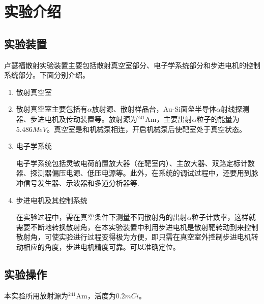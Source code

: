 \documentclass{article}
\begin{document}
\section{实验介绍}
\subsection{实验装置}
卢瑟福散射实验装置主要包括散射真空室部分、电子学系统部分和步进电机的控制系统部分。下面分别介绍。

\begin{enumerate}

\item 散射真空室
\item 
散射真空室主要包括有$\alpha$放射源、散射样品台，Au-Si面垒半导体$\alpha$射线探测器、步进电机及传动装置等。放射源为$^{241}\text{Am}$，主要出射$\alpha$粒子的能量为$5.486\si{MeV}$。真空室是和机械泵相连，开启机械泵后使靶室处于真空状态。

\item
  电子学系统

电子学系统包括灵敏电荷前置放大器（在靶室内）、主放大器、双路定标计数器、探测器偏压电源、低压电源等。此外，在系统的调试过程中，还要用到脉冲信号发生器、示波器和多道分析器等.

\item
  步进电机及其控制系统

在实验过程中，需在真空条件下测量不同散射角的出射$\alpha$粒子计数率，这样就需要不断地转换散射角，在本实验装置中利用步进电机是散射靶转动到来控制散射角，可使实验进行过程变得极为方便，即只需在真空室外控制步进电机转动相应的角度，步进电机精度可靠。可以准确定位。

\end{enumerate}


\subsection{实验操作}

本实验所用放射源为$^{241}\text{Am}$，活度为$0.2\si{mCi}$。
\end{document}
